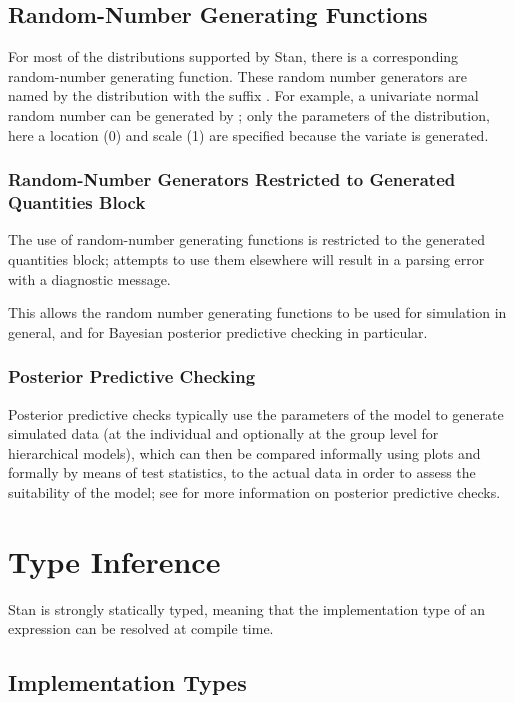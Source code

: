 \subsection{Random-Number Generating Functions}

For most of the distributions supported by Stan, there is a
corresponding random-number generating function.  These random number
generators are named by the distribution with the suffix .
For example, a univariate normal random number can be generated by
;  only the parameters of the distribution,
here a location (0) and scale (1) are specified because the variate is
generated.  

\subsubsection{Random-Number Generators Restricted to Generated Quantities Block}

The use of random-number generating functions is restricted to the
generated quantities block; attempts to use them elsewhere will result
in a parsing error with a diagnostic message.  

This allows the random number generating functions to be used for
simulation in general, and for Bayesian posterior predictive checking
in particular. 

\subsubsection{Posterior Predictive Checking}

Posterior predictive checks typically use the parameters of the model
to generate simulated data (at the individual and optionally at the
group level for hierarchical models), which can then be compared
informally using plots and formally by means of test statistics, to
the actual data in order to assess the suitability of the model; see
\citep[Chapter~6]{GelmanEtAl:2013} for more information on
posterior predictive checks.

\section{Type Inference}

Stan is strongly statically typed, meaning that the implementation
type of an expression can be resolved at compile time.

\subsection{Implementation Types}

